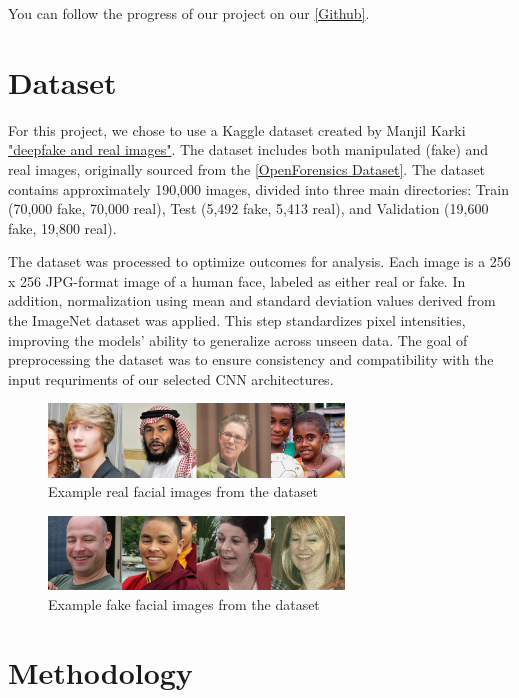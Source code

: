 \documentclass[conference]{IEEEtran}
\begin{document}
You can follow the progress of our project on our \href{https://github.com/konradwojda/HYU-AI-G08}{[Github]}.

\section*{Dataset}
For this project, we chose to use a Kaggle dataset created by Manjil Karki \href{https://www.kaggle.com/datasets/manjilkarki/deepfake-and-real-images}{"deepfake and real images"}. The dataset includes both manipulated (fake) and real images, originally sourced from the \href{https://sites.google.com/view/ltnghia/research/openforensics}{[OpenForensics Dataset]}. The dataset contains approximately 190,000 images, divided into three main directories: Train (70,000 fake, 70,000 real), Test (5,492 fake, 5,413 real), and Validation (19,600 fake, 19,800 real).

The dataset was processed to optimize outcomes for analysis. Each image is a 256 x 256 JPG-format image of a human face, labeled as either real or fake. In addition,  normalization using mean and standard deviation values derived from the ImageNet dataset was applied. This step standardizes pixel intensities, improving the models' ability to generalize across unseen data. The goal of preprocessing the dataset was to ensure consistency and compatibility with the input requriments of our selected CNN architectures.

\begin{figure}[ht]
\centering
\includegraphics[width=0.7\textwidth]{reall.png}
\caption{Example real facial images from the dataset}
\label{reall}
\end{figure} 
\begin{figure}[ht]
\centering
\includegraphics[width=0.7\textwidth]{fakee.png}
\caption{Example fake facial images from the dataset}
\label{fakee}
\end{figure} 


\section*{Methodology}
\end{document}
